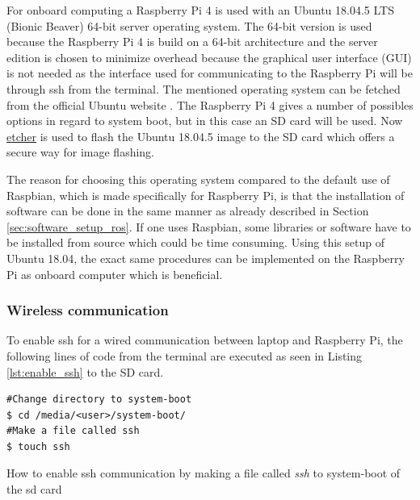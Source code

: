 \documentclass[../Head/report.tex]{subfiles}
\begin{document}
For onboard computing a Raspberry Pi 4 is used with an Ubuntu 18.04.5 LTS (Bionic Beaver) 64-bit server operating system. The 64-bit version is used because the Raspberry Pi 4 is build on a 64-bit architecture and the server edition is chosen to minimize overhead because the graphical user interface (GUI) is not needed as the interface used for communicating to the Raspberry Pi will be through ssh from the terminal. The mentioned operating system can be fetched from the official Ubuntu website \cite{ubuntuImage}. The Raspberry Pi 4 gives a number of possibles options in regard to system boot, but in this case an SD card will be used. Now  \href{https://www.balena.io/etcher/}{etcher} is used to flash the Ubuntu 18.04.5 image to the SD card which offers a secure way for image flashing. 

The reason for choosing this operating system compared to the default use of Raspbian, which is made specifically for Raspberry Pi, is that the installation of software can be done in the same manner as already described in Section \ref{sec:software_setup_ros}. If one uses Raspbian, some libraries or software have to be installed from source which could be time consuming. Using this setup of Ubuntu 18.04, the exact same procedures can be implemented on the Raspberry Pi as onboard computer which is beneficial. 

\subsubsection{Wireless communication}
\label{sec:wireless_communication_pi}
To enable ssh for a wired communication between laptop and Raspberry Pi, the following lines of code from the terminal are executed as seen in Listing \ref{lst:enable_ssh} to the SD card.      

\begin{listing}[H] 
\begin{tcolorbox}[
    enhanced,
    attach boxed title to top left={xshift=6mm,yshift=-3mm},
    colback=lightgreen!20,
    colframe=lightgreen,
    fonttitle=\bfseries\color{black},
]
\begin{verbatim}
#Change directory to system-boot
$ cd /media/<user>/system-boot/
#Make a file called ssh
$ touch ssh
\end{verbatim}
\end{tcolorbox}
\caption{How to enable ssh communication by making a file called \textit{ssh} to system-boot of the sd card}
\label{lst:enable_ssh}    
\end{listing}  
\end{document}
